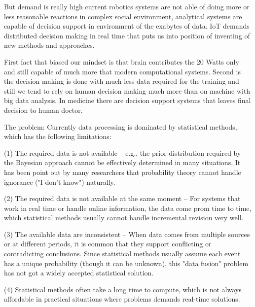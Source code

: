 \documentclass[procedia]{easychair}
\begin{document}
But demand is really high current robotics systems are not able of doing more or less reasonable reactions in complex social environment, analytical systems are capable of decision support in environment of the exabytes of data. IoT demands distributed decision making in real time that puts us into position of inventing of new methods and approaches.

First fact that biased our mindset is that brain contributes the 20 Watts only and still capable of much more that modern computational systems. Second is the decision making is done with much less data required for the training and still we tend to rely on human decision making much more than on machine with big data analysis. In medicine there are decision support systems that leaves final decision to human doctor.

The problem: Currently data processing is dominated by statistical methods, which has the following limitations:

(1) The required data is not available -- e.g., the prior distribution required by the Bayesian approach cannot be effectively determined in many situations. It has been point out by many researchers that probability theory cannot handle ignorance ("I don't know") naturally.

(2) The required data is not available at the same moment -- For systems that work in real time or handle online information, the data come prom time to time, which statistical methods usually cannot handle incremental revision very well.

(3) The available data are inconsistent -- When data comes from multiple sources or at different periods, it is common that they support conflicting or contradicting conclusions. Since statistical methods usually assume each event has a unique probability (though it can be unknown), this "data fusion" problem has not got a widely accepted statistical solution.

(4) Statistical methods often take a long time to compute, which is not always affordable in practical situations where problems demands real-time solutions.
\end{document}
